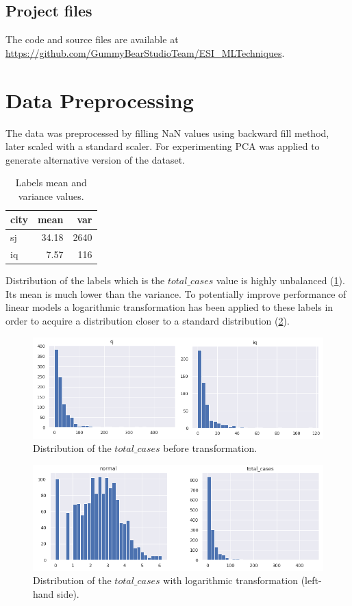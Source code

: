 \documentclass[sigconf]{acmart}
\begin{document}
\subsection{Project files}
The code and source files are available at  \url{https://github.com/GummyBearStudioTeam/ESI_MLTechniques}.

\section{Data Preprocessing}
The data was preprocessed by filling NaN values using backward fill method, later scaled with a standard scaler. For experimenting PCA was applied to generate alternative version of the dataset.

\begin{table}[h]
    \begin{tabular}{|l|r|r|}
    \hline
    city & mean  & var  \\ \hline
    sj   & 34.18 & 2640 \\
    iq   & 7.57  & 116  \\ \hline
    \end{tabular}
    \centering
    \caption{Labels mean and variance values.}
\end{table}

Distribution of the labels which is the $total\_cases$ value is highly unbalanced (\ref{totalcases}). Its mean is much lower than the variance.
To potentially improve performance of linear models a logarithmic transformation has been applied to these labels in order to acquire a distribution closer to a standard distribution (\ref{totalcasesnormal}).

\begin{figure}[h]
    \includegraphics[width=\linewidth]{total-cases.png}
    \centering
    \caption{Distribution of the $total\_cases$ before transformation.}
    \label{totalcases}
\end{figure}
\begin{figure}[h]
    \includegraphics[width=\linewidth]{normal-total-cases.png}
    \centering
    \caption{Distribution of the $total\_cases$ with logarithmic transformation (left-hand side).}
    \label{totalcasesnormal}
\end{figure}
\end{document}
